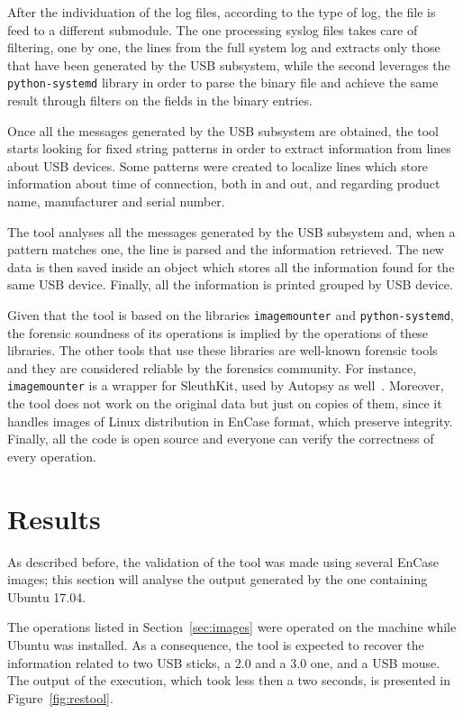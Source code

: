 \documentclass[a4paper,twocolumn]{article}
\begin{document}
After the individuation of the log files, according to the type of log, the
file is feed to a different submodule. The one processing syslog files takes
care of filtering, one by one, the lines from the full system log and extracts
only those that have been generated by the USB subsystem, while the second
leverages the \texttt{python-systemd} library in order to parse the binary file
and achieve the same result through filters on the fields in the binary
entries.

Once all the messages generated by the USB subsystem are obtained, the tool
starts looking for fixed string patterns in order to extract information from
lines about USB devices. Some patterns were created to localize lines
which store information about time of connection, both in and out, and
regarding product name, manufacturer and serial number.

The tool analyses all the messages generated by the USB subsystem and, when a
pattern matches one, the line is parsed and the information retrieved. The new
data is then saved inside an object which stores all the information found for
the same USB device. Finally, all the information is printed grouped by USB
device.

Given that the tool is based on the libraries \texttt{imagemounter} and
\texttt{python-systemd}, the forensic soundness of its operations is implied by
the operations of these libraries. The other tools that use these libraries are
well-known forensic tools and they are considered reliable by the forensics
community. For instance, \texttt{imagemounter} is a wrapper for SleuthKit, used
by Autopsy as well~\cite{sleuthkit}. Moreover, the tool does not work on the
original data but just on copies of them, since it handles images of Linux
distribution in EnCase format, which preserve integrity. Finally, all the code
is open source and everyone can verify the correctness of every operation.

\section{Results}
\label{sec:result}
As described before, the validation of the tool was made using several EnCase
images; this section will analyse the output generated by the one containing
Ubuntu 17.04.

The operations listed in Section~\ref{sec:images} were operated on the machine
while Ubuntu was installed. As a consequence, the tool is expected to recover
the information related to two USB sticks, a 2.0 and a 3.0 one, and a USB mouse.
The output of the execution, which took less then a two seconds, is presented in
Figure~\ref{fig:restool}.
\end{document}
